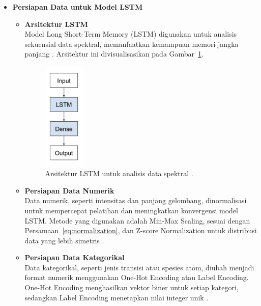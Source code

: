 \begin{itemize}
    \item \textbf{Persiapan Data untuk Model LSTM}
        \begin{itemize}
            \item \textbf{Arsitektur LSTM} \\
                  Model Long Short-Term Memory (LSTM) digunakan untuk analisis sekuensial data spektral, memanfaatkan kemampuan memori jangka panjang \citep{brownlee2017}. Arsitektur ini divisualisasikan pada Gambar~\ref{fig:lstm_architecture}.
                  \begin{figure}[h]
                      \centering
                      \includegraphics[width=0.2\textwidth]{images/lstm1.png}
                      \caption{Arsitektur LSTM untuk analisis data spektral \parencite{brownlee2017}.}
                      \label{fig:lstm_architecture}
                  \end{figure}

            \item \textbf{Persiapan Data Numerik} \\
                  Data numerik, seperti intensitas dan panjang gelombang, dinormalisasi untuk mempercepat pelatihan dan meningkatkan konvergensi model LSTM. Metode yang digunakan adalah Min-Max Scaling, sesuai dengan Persamaan~\eqref{eq:normalization}, dan Z-score Normalization untuk distribusi data yang lebih simetris \parencite{brownlee2017}.

            \item \textbf{Persiapan Data Kategorikal} \\
                  Data kategorikal, seperti jenis transisi atau spesies atom, diubah menjadi format numerik menggunakan One-Hot Encoding atau Label Encoding. One-Hot Encoding menghasilkan vektor biner untuk setiap kategori, sedangkan Label Encoding menetapkan nilai integer unik \parencite{brownlee2017}.


\end{itemize}
\end{itemize}
